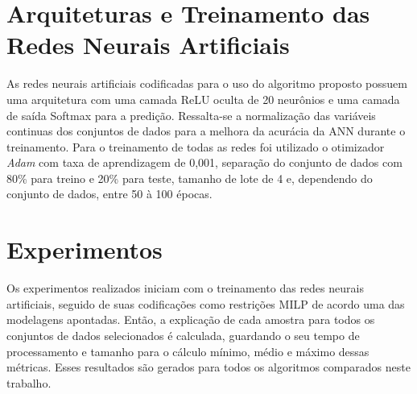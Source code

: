 \section{Arquiteturas e Treinamento das Redes Neurais Artificiais}

As redes neurais artificiais codificadas para o uso do algoritmo proposto possuem uma arquitetura com uma camada  ReLU oculta de 20 neurônios e uma camada de saída Softmax para a predição. Ressalta-se a normalização das variáveis continuas dos conjuntos de dados para a melhora da acurácia da ANN durante o treinamento. Para o treinamento de todas as redes foi utilizado o otimizador \textit{Adam} com taxa de aprendizagem de 0,001, separação do conjunto de dados com 80\% para treino e 20\% para teste, tamanho de lote de 4 e, dependendo do conjunto de dados, entre 50 à 100 épocas. 

\section{Experimentos}

Os experimentos realizados iniciam com o treinamento das redes neurais artificiais, seguido de suas codificações como restrições MILP de acordo uma das modelagens apontadas. Então, a explicação de cada amostra para todos os conjuntos de dados selecionados é calculada, guardando o seu tempo de processamento e tamanho para o cálculo mínimo, médio e máximo dessas métricas. Esses resultados são gerados para todos os algoritmos comparados neste trabalho.
